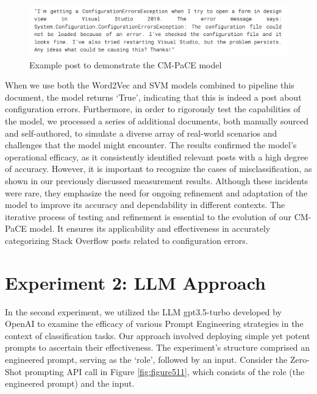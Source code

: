\documentclass[english,bachelor]{swsLeipzig}
\begin{document}
\begin{figure}[h]
  \centering
  \includegraphics[width=1\textwidth]{images/examplepost.png}
  \caption{Example post to demonstrate the CM-PaCE model}
  \label{fig:figure59}
\end{figure}

When we use both the Word2Vec and SVM models combined to pipeline this document, the model returns 
`True', indicating that this is indeed a post about configuration errors. Furthermore, in order to rigorously test the capabilities of the model, we processed a series of additional documents, both manually sourced and self-authored, to simulate a diverse array of real-world scenarios and challenges that the model might encounter. The results confirmed the model's operational efficacy, as it consistently identified relevant posts with a high degree of accuracy. However, it is important to recognize the cases of misclassification, as shown in our previously discussed measurement results. Although these incidents were rare, they emphasize the need for ongoing refinement and adaptation of the model to improve its accuracy and dependability in different contexts. The iterative process of testing and refinement is essential to the evolution of our CM-PaCE model. It ensures its applicability and effectiveness in accurately categorizing Stack Overflow posts related to configuration errors.

\section{Experiment 2: LLM Approach}

In the second experiment, we utilized the LLM gpt3.5-turbo developed by OpenAI 
to examine the efficacy of various Prompt Engineering strategies in the context of classification tasks. Our approach involved deploying simple yet potent prompts to ascertain their effectiveness. The experiment's structure comprised an engineered prompt, serving as the `role', followed by an input. Consider the Zero-Shot prompting API call in Figure \ref{fig:figure511}, which consists of the role (the engineered prompt) and the input.
\end{document}
